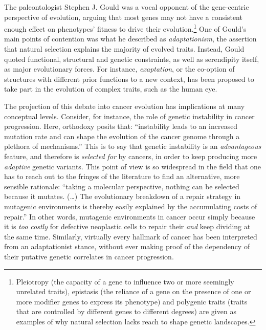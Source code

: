 The paleontologist Stephen J. Gould was a vocal opponent of the gene-centric
perspective of evolution, arguing that most genes may not have a consistent
enough effect on phenotypes' fitness to drive their
evolution.\footnote{Pleiotropy (the capacity of a gene to influence two or more
  seemingly unrelated traits), epistasis (the reliance of a gene on the presence
  of one or more modifier genes to express its phenotype) and polygenic traits
  (traits that are controlled by different genes to different degrees) are given
  as examples of why natural selection lacks reach to shape genetic landscapes.}
One of Gould's main points of contention was what he described as
\emph{adaptationism}, the assertion that natural selection explains the majority
of evolved traits.\cite{gould_spandrels_1979} Instead, Gould quoted functional,
structural and genetic constraints, as well as serendipity itself, as major
evolutionary forces.  For instance, \emph{exaptation}, or the co-option of
structures with different prior functions to a new context, has been proposed to
take part in the evolution of complex traits, such as the human
eye.\cite{gould_exaptation_1982}


The projection of this debate into cancer evolution has implications at many
conceptual levels.  Consider, for instance, the role of genetic instability in
cancer progression.  Here, orthodoxy posits that: ``instability leads to an
increased mutation rate and can shape the evolution of the cancer genome through
a plethora of mechanisms.''\cite{burrell_causes_2013} This is to say that
genetic instability is an \emph{advantageous} feature, and therefore is
\emph{selected for} by cancers, in order to keep producing more \emph{adaptive}
genetic variants.  This point of view is so widespread in the field that one has
to reach out to the fringes of the literature to find an alternative, more
sensible rationale: ``taking a molecular perspective, nothing can be selected
because it mutates. (\ldots{}) The evolutionary breakdown of a repair strategy
in mutagenic environments is thereby easily explained by the accumulating costs
of repair.''\cite{breivik_evolutionary_2005} In other words, mutagenic
environments in cancer occur simply because it is \emph{too costly} for
defective neoplastic cells to repair their  \emph{and} keep
dividing at the same time.  Similarly, virtually every hallmark of cancer has
been interpreted from an adaptationist stance, without ever making proof of the
dependency of their putative genetic correlates in cancer
progression.\cite{bernards_progression_2002}

